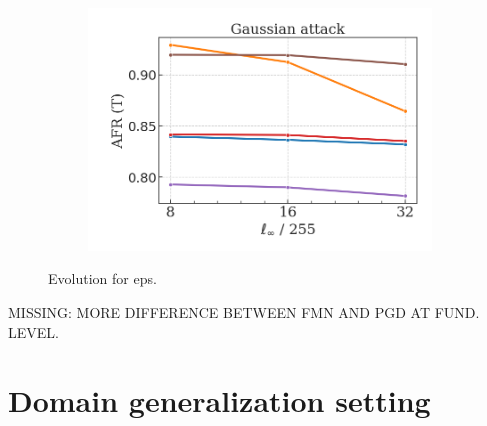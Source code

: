 \begin{figure}[H]
\begin{subfigure}[b]{0.3\textwidth}
        \includegraphics[width=\textwidth]{img/results_discussion/adversarial/GAUSSIAN_AFR_true_eps.png}
    \end{subfigure}
    \caption{Evolution for eps.}
    \label{fig:gaussian_optimization}
\end{figure}

MISSING: MORE DIFFERENCE BETWEEN FMN AND PGD AT FUND. LEVEL.

\section{Domain generalization setting}\label{results_domain_generalization}


